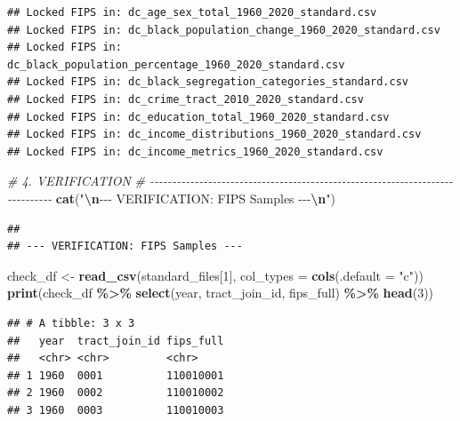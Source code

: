 \documentclass[
]{article}
\newenvironment{Shaded}{\begin{snugshade}}{\end{snugshade}}
\newcommand{\AttributeTok}[1]{\textcolor[rgb]{0.13,0.29,0.53}{#1}}
\newcommand{\CommentTok}[1]{\textcolor[rgb]{0.56,0.35,0.01}{\textit{#1}}}
\newcommand{\DecValTok}[1]{\textcolor[rgb]{0.00,0.00,0.81}{#1}}
\newcommand{\FunctionTok}[1]{\textcolor[rgb]{0.13,0.29,0.53}{\textbf{#1}}}
\newcommand{\NormalTok}[1]{#1}
\newcommand{\OtherTok}[1]{\textcolor[rgb]{0.56,0.35,0.01}{#1}}
\newcommand{\SpecialCharTok}[1]{\textcolor[rgb]{0.81,0.36,0.00}{\textbf{#1}}}
\newcommand{\StringTok}[1]{\textcolor[rgb]{0.31,0.60,0.02}{#1}}
\begin{document}
\begin{verbatim}
## Locked FIPS in: dc_age_sex_total_1960_2020_standard.csv 
## Locked FIPS in: dc_black_population_change_1960_2020_standard.csv 
## Locked FIPS in: dc_black_population_percentage_1960_2020_standard.csv 
## Locked FIPS in: dc_black_segregation_categories_standard.csv 
## Locked FIPS in: dc_crime_tract_2010_2020_standard.csv 
## Locked FIPS in: dc_education_total_1960_2020_standard.csv 
## Locked FIPS in: dc_income_distributions_1960_2020_standard.csv 
## Locked FIPS in: dc_income_metrics_1960_2020_standard.csv
\end{verbatim}

\begin{Shaded}
\begin{Highlighting}[]
\CommentTok{\# 4. VERIFICATION}
\CommentTok{\# {-}{-}{-}{-}{-}{-}{-}{-}{-}{-}{-}{-}{-}{-}{-}{-}{-}{-}{-}{-}{-}{-}{-}{-}{-}{-}{-}{-}{-}{-}{-}{-}{-}{-}{-}{-}{-}{-}{-}{-}{-}{-}{-}{-}{-}{-}{-}{-}{-}{-}{-}{-}{-}{-}{-}{-}{-}{-}{-}{-}{-}{-}{-}{-}{-}{-}{-}{-}{-}{-}{-}{-}{-}{-}{-}{-}{-}{-}}
\FunctionTok{cat}\NormalTok{(}\StringTok{"}\SpecialCharTok{\textbackslash{}n}\StringTok{{-}{-}{-} VERIFICATION: FIPS Samples {-}{-}{-}}\SpecialCharTok{\textbackslash{}n}\StringTok{"}\NormalTok{)}
\end{Highlighting}
\end{Shaded}

\begin{verbatim}
## 
## --- VERIFICATION: FIPS Samples ---
\end{verbatim}

\begin{Shaded}
\begin{Highlighting}[]
\NormalTok{check\_df }\OtherTok{\textless{}{-}} \FunctionTok{read\_csv}\NormalTok{(standard\_files[}\DecValTok{1}\NormalTok{], }\AttributeTok{col\_types =} \FunctionTok{cols}\NormalTok{(}\AttributeTok{.default =} \StringTok{"c"}\NormalTok{))}
\FunctionTok{print}\NormalTok{(check\_df }\SpecialCharTok{\%\textgreater{}\%} \FunctionTok{select}\NormalTok{(year, tract\_join\_id, fips\_full) }\SpecialCharTok{\%\textgreater{}\%} \FunctionTok{head}\NormalTok{(}\DecValTok{3}\NormalTok{))}
\end{Highlighting}
\end{Shaded}

\begin{verbatim}
## # A tibble: 3 x 3
##   year  tract_join_id fips_full
##   <chr> <chr>         <chr>    
## 1 1960  0001          110010001
## 2 1960  0002          110010002
## 3 1960  0003          110010003
\end{verbatim}
\end{document}
